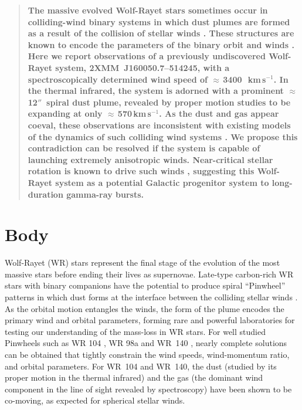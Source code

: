 \documentclass[preprint,times]{aastex61}
\begin{document}
\begin{abstract}

\noindent\textbf{The massive evolved Wolf-Rayet stars sometimes occur in colliding-wind binary systems in which dust plumes are formed as a result of the collision of stellar winds \citep{2007ARA&A..45..177C}. These structures are known to encode the parameters of the binary orbit and winds \citep{1999Natur.398..487T,1999ApJ...525L..97M,tuthill2008}. Here we report observations of a previously undiscovered Wolf-Rayet system, 2XMM~J160050.7--514245, with a spectroscopically determined wind speed of $\approx$\,3400~\,km\,s$^{-1}$. In the thermal infrared, the system is adorned with a prominent $\approx$\,12$''$~spiral dust plume, revealed by proper motion studies to be expanding at only $\approx\,$570\,km\,s$^{-1}$. As the dust and gas appear coeval, these observations are inconsistent with existing models of the dynamics of such colliding wind systems \citep{2002MNRAS.329..897H,2015MNRAS.450.2551M,2017ApJ...835L..31L}. We propose this contradiction can be resolved if the system is capable of launching extremely anisotropic winds. Near-critical stellar rotation is known to drive such winds \citep{2004A&A...418..639A,deMink2013}, suggesting this Wolf-Rayet system as a potential Galactic progenitor system to long-duration gamma-ray bursts.}

\end{abstract}

\section*{Body} \label{sec:body}

Wolf-Rayet (WR) stars represent the final stage of the evolution of the most massive stars before ending their lives as supernovae. Late-type carbon-rich WR stars with binary companions have the potential to produce spiral ``Pinwheel'' patterns in which dust forms at the interface between the colliding stellar winds \citep{1990MNRAS.243..662W,1999Natur.398..487T}. As the orbital motion entangles the winds, the form of the plume encodes the primary wind and orbital parameters, forming rare and powerful laboratories for testing our understanding of the mass-loss in WR stars. For well studied Pinwheels such as WR 104 \citep{1999Natur.398..487T,tuthill2008}, WR 98a \citep{1999ApJ...525L..97M} and WR~140 \citep{Monnier2002,Williams2009}, nearly complete solutions can be obtained that tightly constrain the wind speeds, wind-momentum ratio, and orbital parameters. For WR~104 and WR~140, the dust (studied by its proper motion in the thermal infrared) and the gas (the dominant wind component in the line of sight revealed by spectroscopy) have been shown to be co-moving, as expected for spherical stellar winds. 
\end{document}
